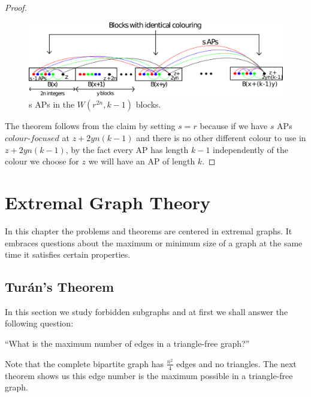 \documentclass[12pt,twoside,a4paper,bibliography=totocnumbered]{book}
\numberwithin{equation}{section}
\theoremstyle{remark}
\begin{document}
\begin{proof}
\begin{figure}[H]
     \centering
     \includegraphics[scale=0.38]{Figuras/Van-der-Waerden-Blocks.png}
     \caption{s APs in the $W(r^{2n},k-1)$ blocks.}
     \label{fig:VanderWaerdenBlocks}
\end{figure}

The theorem follows from the claim by setting $s=r$ because if we have $s$  APs $\textit{colour-focused}$ at $z+2yn(k-1)$ and there is no other different colour to use in $z+2yn(k-1)$, by the fact every AP has length $k-1$  independently of the colour we choose for $z$ we will have an AP of length $k$.
\end{proof}



\chapter{Extremal Graph Theory}
In this chapter the problems and theorems are centered in extremal graphs. It embraces questions about the maximum or minimum size of a graph at the same time it satisfies certain properties.

\section{Turán's Theorem}
In this section we study forbidden subgraphs and at first we shall answer the following 
question: 
\begin{center}``What is the maximum number of edges in a triangle-free graph?''\end{center}

Note that the complete bipartite graph has $\frac{n^{2}}{4}$ edges and no triangles. The next theorem shows us this edge number is the maximum possible in a triangle-free graph.\\
\end{document}
